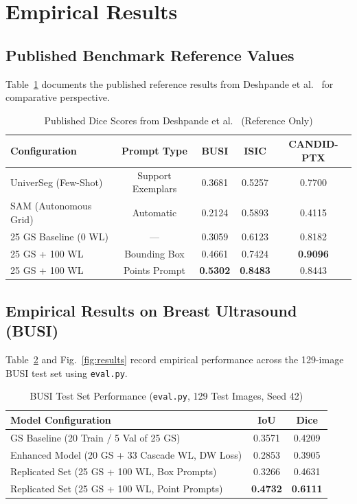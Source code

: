 \documentclass[journal,11pt,onecolumn,draftclsnofoot]{IEEEtran}
\begin{document}
\section{Empirical Results}
\label{sec:results}

\subsection{Published Benchmark Reference Values}
Table~\ref{tab:published} documents the published reference results from Deshpande et al.~\cite{deshpande2024} for comparative perspective.

\begin{table}[t]
\renewcommand{\arraystretch}{1.15}
\caption{Published Dice Scores from Deshpande et al.~\cite{deshpande2024} (Reference Only)}
\label{tab:published}
\centering\footnotesize
\begin{tabular}{@{}lcccc@{}}
\toprule
Configuration & Prompt Type & BUSI & ISIC & CANDID-PTX \\
\midrule
UniverSeg (Few-Shot)~\cite{butoi2023} & Support Exemplars & 0.3681 & 0.5257 & 0.7700 \\
SAM (Autonomous Grid)~\cite{kirillov2023} & Automatic & 0.2124 & 0.5893 & 0.4115 \\
\midrule
25 GS Baseline (0 WL) & --- & 0.3059 & 0.6123 & 0.8182 \\
25 GS + 100 WL & Bounding Box & 0.4661 & 0.7424 & \textbf{0.9096} \\
25 GS + 100 WL & Points Prompt & \textbf{0.5302} & \textbf{0.8483} & 0.8443 \\
\bottomrule
\end{tabular}
\end{table}

\subsection{Empirical Results on Breast Ultrasound (BUSI)}
Table~\ref{tab:busi} and Fig.~\ref{fig:results} record empirical performance across the 129-image BUSI test set using \texttt{eval.py}.

\begin{table}[t]
\renewcommand{\arraystretch}{1.15}
\caption{BUSI Test Set Performance (\texttt{eval.py}, 129 Test Images, Seed 42)}
\label{tab:busi}
\centering\footnotesize
\begin{tabular}{@{}lcc@{}}
\toprule
Model Configuration & IoU & Dice \\
\midrule
GS Baseline (20 Train / 5 Val of 25 GS) & 0.3571 & 0.4209 \\
Enhanced Model (20 GS + 33 Cascade WL, DW Loss) & 0.2853 & 0.3905 \\
Replicated Set (25 GS + 100 WL, Box Prompts) & 0.3266 & 0.4631 \\
Replicated Set (25 GS + 100 WL, Point Prompts) & \textbf{0.4732} & \textbf{0.6111} \\
\bottomrule
\end{tabular}
\end{table}
\end{document}
